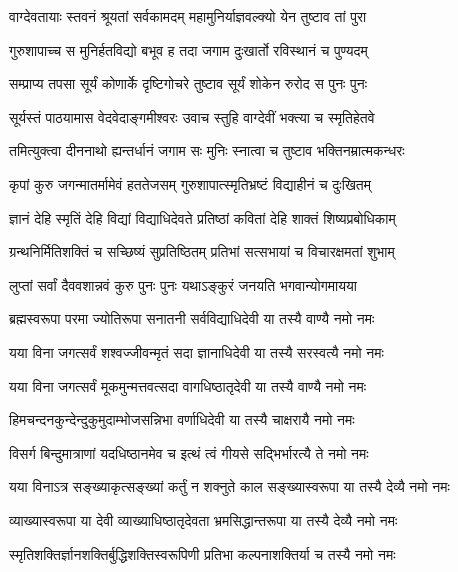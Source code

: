 

\twolineshloka
{वाग्देवतायाः स्तवनं श्रूयतां सर्वकामदम्}
{महामुनिर्याज्ञवल्क्यो येन तुष्टाव तां पुरा}%

\twolineshloka
{गुरुशापाच्च स मुनिर्हतविद्यो बभूव ह}
{तदा जगाम दुःखार्तो रविस्थानं च पुण्यदम्}%

\twolineshloka
{सम्प्राप्य तपसा सूर्यं कोणार्के दृष्टिगोचरे}
{तुष्टाव सूर्यं शोकेन रुरोद स पुनः पुनः}%

\twolineshloka
{सूर्यस्तं पाठयामास वेदवेदाङ्गमीश्वरः}
{उवाच स्तुहि वाग्देवीं भक्त्या च स्मृतिहेतवे}%

\twolineshloka
{तमित्युक्त्वा दीननाथो ह्यन्तर्धानं जगाम सः}
{मुनिः स्नात्वा च तुष्टाव भक्तिनम्रात्मकन्धरः}%

\twolineshloka
{कृपां कुरु जगन्मातर्मामेवं हततेजसम्}
{गुरुशापात्स्मृतिभ्रष्टं विद्याहीनं च दुःखितम्}%

\twolineshloka
{ज्ञानं देहि स्मृतिं देहि विद्यां विद्याधिदेवते}
{प्रतिष्ठां कवितां देहि शाक्तं शिष्यप्रबोधिकाम्}%

\twolineshloka
{ग्रन्थनिर्मितिशक्तिं च सच्छिष्यं सुप्रतिष्ठितम्}
{प्रतिभां सत्सभायां च विचारक्षमतां शुभाम्}%

\twolineshloka
{लुप्तां सर्वां दैववशान्नवं कुरु पुनः पुनः}
{यथाऽङ्कुरं जनयति भगवान्योगमायया}%

\twolineshloka
{ब्रह्मस्वरूपा परमा ज्योतिरूपा सनातनी}
{सर्वविद्याधिदेवी या तस्यै वाण्यै नमो नमः}%

\twolineshloka
{यया विना जगत्सर्वं शश्वज्जीवन्मृतं सदा}
{ज्ञानाधिदेवी या तस्यै सरस्वत्यै नमो नमः}%

\twolineshloka
{यया विना जगत्सर्वं मूकमुन्मत्तवत्सदा}
{वागधिष्ठातृदेवी या तस्यै वाण्यै नमो नमः}%

\twolineshloka
{हिमचन्दनकुन्देन्दुकुमुदाम्भोजसन्निभा}
{वर्णाधिदेवी या तस्यै चाक्षरायै नमो नमः}%

\twolineshloka
{विसर्ग बिन्दुमात्राणां यदधिष्ठानमेव च}
{इत्थं त्वं गीयसे सद्भिर्भारत्यै ते नमो नमः}%

\twolineshloka
{यया विनाऽत्र सङ्ख्याकृत्सङ्ख्यां कर्तुं न शक्नुते}
{काल सङ्ख्यास्वरूपा या तस्यै देव्यै नमो नमः}%

\twolineshloka
{व्याख्यास्वरूपा या देवी व्याख्याधिष्ठातृदेवता}
{भ्रमसिद्धान्तरूपा या तस्यै देव्यै नमो नमः}%

\twolineshloka
{स्मृतिशक्तिर्ज्ञानशक्तिर्बुद्धिशक्तिस्वरूपिणी}
{प्रतिभा कल्पनाशक्तिर्या च तस्यै नमो नमः}%

